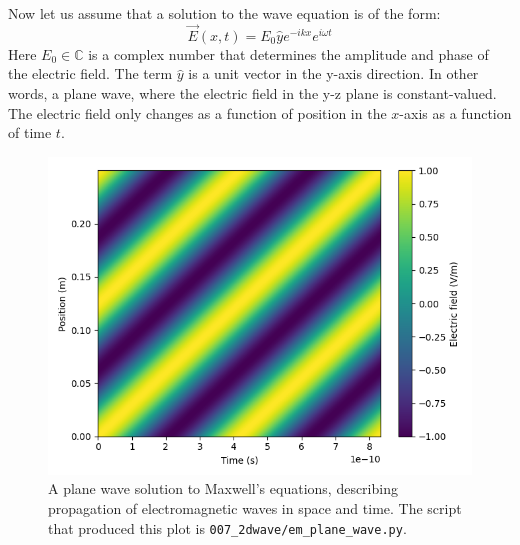 Now let us assume that a solution to the wave equation is of the form:
\begin{equation}
\vec{E}(x,t)= E_0 \hat{y} e^{-i k x}e^{i\omega t}
\label{efieldplanewave}
\end{equation}
Here $E_0 \in \mathbb{C}$ is a complex number that determines the amplitude and phase of the electric field. The term $\hat{y}$ is a unit vector in the y-axis direction. 
In other words, a plane wave, where the electric field in the y-z plane is constant-valued. The electric field only changes as a function of position in the $x$-axis as a function of time $t$.

\begin{figure}
\begin{center}
\includegraphics[width=\textwidth]{code/007_2dwave/em_plane_wave.png}
\end{center}
\caption{A plane wave solution to Maxwell's equations, describing propagation of electromagnetic waves in space and time. The script that produced this plot is \texttt{007\_2dwave/em\_plane\_wave.py}. }
\label{fig:planewave}
\end{figure}

